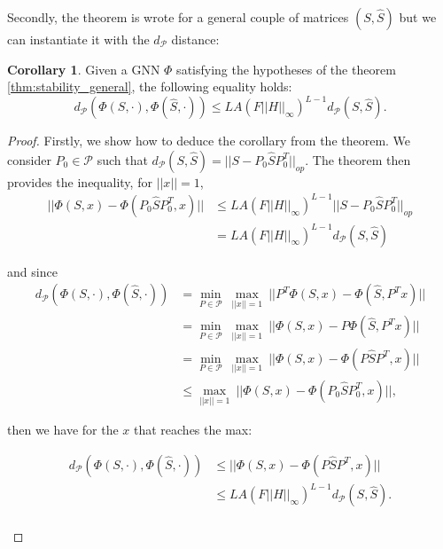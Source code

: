 \documentclass[11pt,a4paper]{article}
\newcommand{\cP}{\mathcal{P}}
\newcommand{\op}[1]{|| #1 ||_{op}}
\newcommand{\ninf}[1]{|| #1 ||_\infty}
\theoremstyle{definition}
\newtheorem{corollary}{Corollary}[theorem]
\renewcommand{\leq}{\leqslant}
\begin{document}
        Secondly, the theorem is wrote for a general couple of matrices $(S,\hat{S})$ but we can instantiate it with the $d_\cP$ distance:

        \begin{corollary}
        Given a GNN $\Phi$ satisfying the hypotheses of the theorem \ref{thm:stability_general}, the following equality holds:
            $$ d_\cP(\Phi(S,\cdot),\Phi(\hat{S},\cdot)) \leq LA (F \ninf{H} )^ {L-1} d_\cP (S,\hat{S}).$$
        \end{corollary}


        \begin{proof}   
            Firstly, we show how to deduce the corollary from the theorem. We consider $P_0 \in \cP$ such that $d_\cP(S,\hat{S})=||S- P_0 \hat{S} P_0^T ||_{op}$. The theorem then provides the inequality, for $||x||=1$,
            \begin{align*}
                || \Phi (S,x) - \Phi (P_0 \hat{S} P_0^T,x) || &\leq L A (F \ninf{H} )^ {L-1} \op{S - P_0 \hat{S} P_0^T} \\
                &= L A (F \ninf{H} )^ {L-1} d_\cP(S,\hat{S})
            \end{align*}

            and since 
            \begin{align*}
                d_\cP(\Phi(S,\cdot),\Phi(\hat{S},\cdot)) &= \underset{P \in \cP}{\min} \ \underset{||x|| = 1}{\max} \ || P^T \Phi (S,x) - \Phi(\hat{S}, P^T x) || \\
                &= \underset{P \in \cP}{\min} \ \underset{||x|| = 1}{\max} \ ||\Phi (S,x) - P \Phi(\hat{S}, P^T x) || \\
                &= \underset{P \in \cP}{\min} \ \underset{||x|| = 1}{\max} \ ||\Phi (S,x) - \Phi(P \hat{S} P^T, x) || \\
                &\leq \underset{||x|| = 1}{\max} \ ||\Phi (S,x) - \Phi(P_0 \hat{S} P_0^T, x) ||,
            \end{align*}

            then we have for the $x$ that reaches the max:

            \begin{align*}
                d_\cP(\Phi(S,\cdot),\Phi(\hat{S},\cdot)) &\leq || \Phi (S,x) - \Phi (P \hat{S} P^T,x) || \\
                &\leq  L A (F \ninf{H} )^ {L-1} d_\cP(S,\hat{S}).
            \end{align*}\\


\end{proof}
\end{document}
